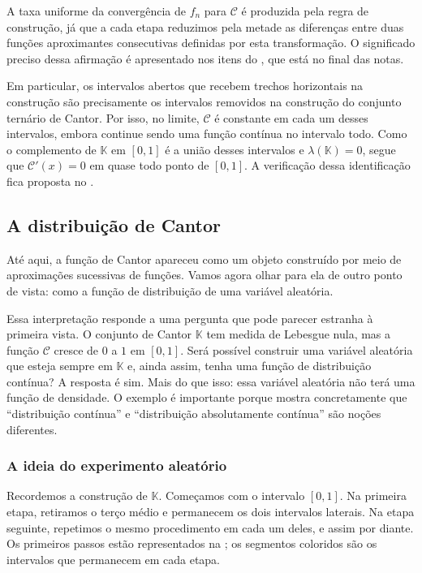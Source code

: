 \documentclass[12pt,portuguese]{article}
\theoremstyle{definition}
\theoremstyle{plainexercise}
\theoremstyle{starredexercise}
\theoremstyle{definition}
\begin{document}
A taxa uniforme da convergência de $f_n$ para $\mathcal{C}$ 
é produzida pela regra de construção, já que a cada etapa reduzimos
pela metade as diferenças entre duas funções aproximantes consecutivas definidas
por esta transformação. O significado preciso dessa afirmação é apresentado 
nos itens do ,
que está no final das notas.

Em particular, os intervalos abertos que recebem trechos horizontais na
construção são precisamente os intervalos removidos na construção do conjunto
ternário de Cantor. Por isso, no limite, $\mathcal{C}$ é constante em cada um
desses intervalos, embora continue sendo uma função contínua no intervalo todo.
Como o complemento de $\mathbb{K}$ em $[0,1]$ é a união desses intervalos e
$\lambda(\mathbb{K})=0$, segue que $\mathcal{C}'(x)=0$ em quase todo ponto de
$[0,1]$.
A verificação dessa identificação fica proposta no
.

\subsection{A distribuição de Cantor}

Até aqui, a função de Cantor apareceu como um objeto construído por meio de
aproximações sucessivas de funções. Vamos agora olhar para ela de outro ponto
de vista: como a função de distribuição de uma variável aleatória.

Essa interpretação responde a uma pergunta que pode parecer estranha à
primeira vista. O conjunto de Cantor $\mathbb{K}$ tem medida de Lebesgue nula,
mas a função $\mathcal{C}$ cresce de $0$ a $1$ em $[0,1]$. Será possível
construir uma variável aleatória que esteja sempre em $\mathbb{K}$ e, ainda
assim, tenha uma função de distribuição contínua? A resposta é sim. Mais do
que isso: essa variável aleatória não terá uma função de densidade. 
O exemplo é importante porque mostra concretamente que
``distribuição contínua'' e ``distribuição absolutamente contínua'' são
noções diferentes.

\subsubsection{A ideia do experimento aleatório}

Recordemos a construção de $\mathbb{K}$. Começamos com o intervalo $[0,1]$.
Na primeira etapa, retiramos o terço médio e permanecem os dois intervalos
laterais. Na etapa seguinte, repetimos o mesmo procedimento em cada um deles,
e assim por diante. Os primeiros passos estão representados na
; os segmentos coloridos são os
intervalos que permanecem em cada etapa.
\end{document}

